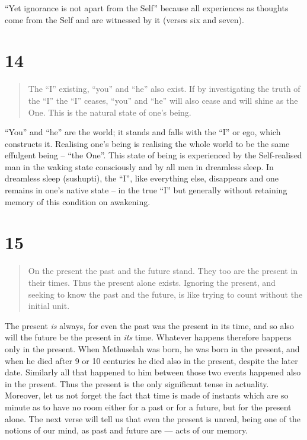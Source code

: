 \documentclass[12pt]{report}
\begin{document}
``Yet ignorance is not apart from the Self'' because all experiences
as thoughts come from the Self and are witnessed by it (verses six and
seven). 

\section*{14}

\begin{quote}
The ``I'' existing, ``you'' and ``he'' also exist. If by investigating
the truth of the ``I'' the ``I'' ceases, ``you'' and ``he'' will also
cease and will shine as the One. This is the natural state of one's
being.

\end{quote}

``You'' and ``he'' are the world; it stands and falls with the ``I''
or ego, which constructs it. Realising one's being is realising the
whole world to be the same effulgent being -- ``the One''. This state
of being is experienced by the Self-realised man in the waking state
consciously and by all men in dreamless sleep. In dreamless sleep
(sushupti), the ``I'', like everything else, disappears and one
remains in one's native state -- in the true ``I'' but generally
without retaining memory of this condition on awakening.

\section*{15}

\begin{quote}
On the present the past and the future stand. They too are the present
in their times. Thus the present alone exists. Ignoring the present,
and seeking to know the past and the future, is like trying to count
without the initial unit.
\end{quote}

The present \emph{is} always, for even the past was the present in its
time, and so also will the future be the present in \emph{its}
time. Whatever happens therefore happens only in the present. When
Methuselah was born, he was born in the present, and when he died
after 9 or 10 centuries he died also in the present, despite the later
date. Similarly all that happened to him between those two events
happened also in the present. Thus the present is the only significant
tense in actuality. Moreover, let us not forget the fact that time is
made of instants which are so minute as to have no room either for a
past or for a future, but for the present alone. The next verse will
tell us that even the present is unreal, being one of the notions of
our mind, as past and future are --- acts of our memory.
\end{document}
